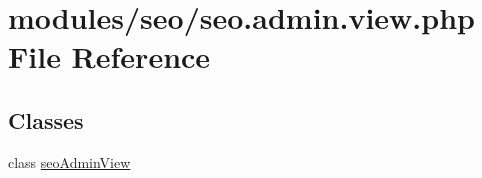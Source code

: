 \hypertarget{seo_8admin_8view_8php}{\section{modules/seo/seo.admin.\-view.\-php File Reference}
\label{seo_8admin_8view_8php}
}
\subsection*{Classes}
\begin{DoxyCompactItemize}
\item 
class \hyperlink{classseoAdminView}{seo\-Admin\-View}
\end{DoxyCompactItemize}
